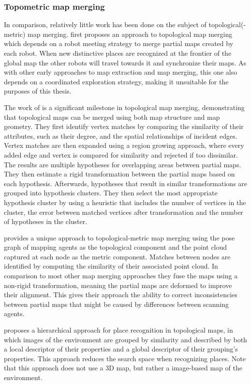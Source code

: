 \subsubsection{Topometric map merging}
In comparison, relatively little work has been done on the subject of topological(-metric) map merging. \citet{dudek_topological_1998} first proposes an approach to topological map merging which depends on a robot meeting strategy to merge partial maps created by each robot. When new distinctive places are recognized at the frontier of the global map the other robots will travel towards it and synchronize their maps. As with other early approaches to map extraction and map merging, this one also depends on a coordinated exploration strategy, making it unsuitable for the purposes of this thesis.

The work of \citet{huang_topological_2005} is a significant milestone in topological map merging, demonstrating that topological maps can be merged using both map structure and map geometry. They first identify vertex matches by comparing the similarity of their attributes, such as their degree, and the spatial relationships of incident edges. Vertex matches are then expanded using a region growing approach, where every added edge and vertex is compared for similarity and rejected if too dissimilar. The results are multiple hypotheses for overlapping areas between partial maps. They then estimate a rigid transformation between the partial maps based on each hypothesis. Afterwards, hypotheses that result in similar transformations are grouped into hypothesis clusters. They then select the most appropriate hypothesis cluster by using a heuristic that includes the number of vertices in the cluster, the error between matched vertices after transformation and the number of hypotheses in the cluster.

\citet{bonanni_3-d_2017} provides a unique approach to topological-metric map merging using the pose graph of mapping agents as the topological component and the point cloud captured at each node as the metric component. Matches between nodes are identified by computing the similarity of their associated point cloud. In comparison to most other map merging approaches they fuse the maps using a non-rigid transformation, meaning the partial maps are deformed to improve their alignment. This gives their approach the ability to correct inconsistencies between partial maps that might be caused by differences between scanning agents.

\citet{garcia-fidalgo_hierarchical_2017} proposes a hierarchical approach for place recognition in topological maps, in which images of the environment are grouped by similarity and described by both a local descriptor of their properties and a global descriptor of their grouping's properties. This approach reduces the search space when recognizing places. Note that this approach does not use a 3D map, but rather a image-based map of the environment.

